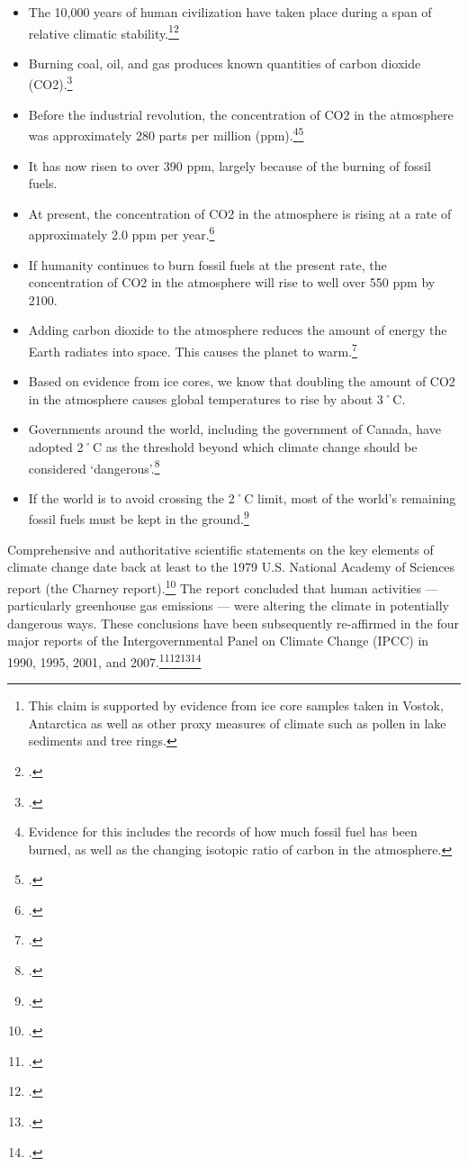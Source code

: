 \begin{itemize}
	\item The 10,000 years of human civilization have taken place during a span of relative climatic stability.\footnote{This claim is supported by evidence from ice core samples taken in Vostok, Antarctica as well as other proxy measures of climate such as pollen in lake sediments and tree rings.}\footcite[][p. 4]{Alley2000}
	\item Burning coal, oil, and gas produces known quantities of carbon dioxide (CO2).\footcite[For example, the U.S. Environmental Protection Agency lists quantities of CO2 produced by burning a barrel of oil, metric tonne of coal, or therm of natural gas:][]{CalculationsReferences}
	\item Before the industrial revolution, the concentration of CO2 in the atmosphere was approximately 280 parts per million (ppm).\footnote{Evidence for this includes the records of how much fossil fuel has been burned, as well as the changing isotopic ratio of carbon in the atmosphere.}\footcite[][]{IPCC4ARdrivers}
	\item It has now risen to over 390 ppm, largely because of the burning of fossil fuels.
	\item At present, the concentration of CO2 in the atmosphere is rising at a rate of approximately 2.0 ppm per year.\footcite[][]{NOAATrends}
	\item If humanity continues to burn fossil fuels at the present rate, the concentration of CO2 in the atmosphere will rise to well over 550 ppm by 2100.
	\item Adding carbon dioxide to the atmosphere reduces the amount of energy the Earth radiates into space. This causes the planet to warm.\footcite[][]{IPCC4ARdrivers}
	\item Based on evidence from ice cores, we know that doubling the amount of CO2 in the atmosphere causes global temperatures to rise by about 3˚C.
	\item Governments around the world, including the government of Canada, have adopted 2˚C as the threshold beyond which climate change should be considered `dangerous'.\footcite{CopenhagenAccord}
	\item If the world is to avoid crossing the 2˚C limit, most of the world's remaining fossil fuels must be kept in the ground.\footcite[][]{IEA2012}
\end{itemize}



Comprehensive and authoritative scientific statements on the key elements of climate change date back at least to the 1979 U.S. National Academy of Sciences report (the Charney report).\footcite[][]{Charney1979}
The report concluded that human activities --- particularly greenhouse gas emissions --- were altering the climate in potentially dangerous ways. These conclusions have been subsequently re-affirmed in the four major reports of the Intergovernmental Panel on Climate Change (IPCC) in 1990, 1995, 2001, and 2007.\footcite[][]{IPCC1990}\footcite[][]{IPCC1995}\footcite[][]{IPCC2001}\footcite[][]{IPCC2007}


